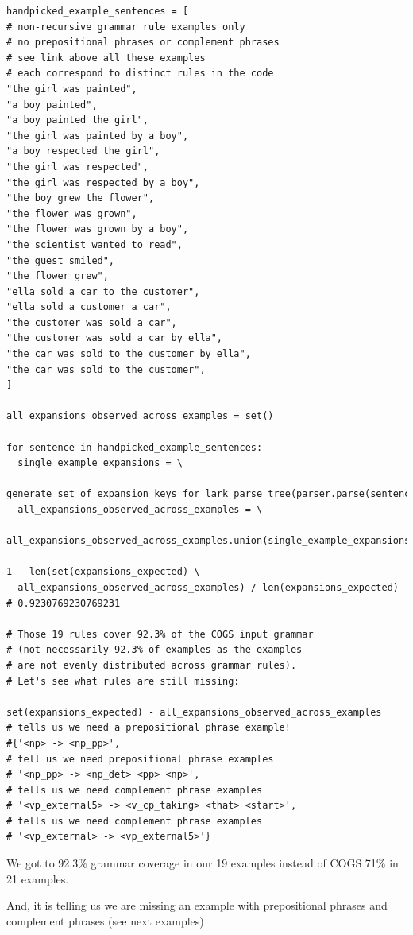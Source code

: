\documentclass[11pt]{article}
\begin{document}
\begin{tiny}
\begin{verbatim}
handpicked_example_sentences = [ 
# non-recursive grammar rule examples only
# no prepositional phrases or complement phrases
# see link above all these examples 
# each correspond to distinct rules in the code
"the girl was painted",
"a boy painted",
"a boy painted the girl",
"the girl was painted by a boy",
"a boy respected the girl", 
"the girl was respected",
"the girl was respected by a boy",
"the boy grew the flower",
"the flower was grown",
"the flower was grown by a boy",
"the scientist wanted to read",
"the guest smiled",
"the flower grew",
"ella sold a car to the customer",
"ella sold a customer a car",
"the customer was sold a car",
"the customer was sold a car by ella",
"the car was sold to the customer by ella",
"the car was sold to the customer",
]

all_expansions_observed_across_examples = set()

for sentence in handpicked_example_sentences:
  single_example_expansions = \
  generate_set_of_expansion_keys_for_lark_parse_tree(parser.parse(sentence.lower()))
  all_expansions_observed_across_examples = \
  all_expansions_observed_across_examples.union(single_example_expansions)

1 - len(set(expansions_expected) \
- all_expansions_observed_across_examples) / len(expansions_expected)
# 0.9230769230769231

# Those 19 rules cover 92.3% of the COGS input grammar
# (not necessarily 92.3% of examples as the examples 
# are not evenly distributed across grammar rules).
# Let's see what rules are still missing:

set(expansions_expected) - all_expansions_observed_across_examples
# tells us we need a prepositional phrase example!
#{'<np> -> <np_pp>',
# tell us we need prepositional phrase examples
# '<np_pp> -> <np_det> <pp> <np>',
# tells us we need complement phrase examples
# '<vp_external5> -> <v_cp_taking> <that> <start>',
# tells us we need complement phrase examples
# '<vp_external> -> <vp_external5>'}
\end{verbatim}
\end{tiny}

\clearpage
We got to 92.3\% grammar coverage in our 19 examples instead of COGS 71\% in 21 examples.

And, it is telling us we are missing an example with prepositional phrases and complement phrases (see next examples)
\end{document}
